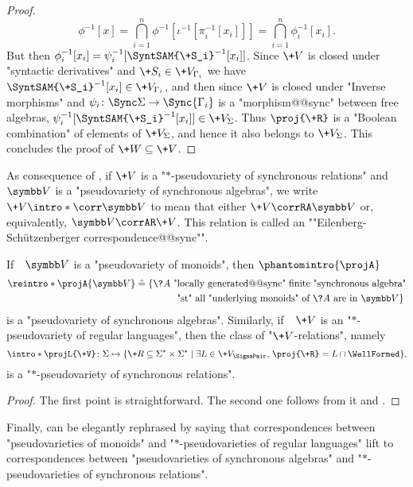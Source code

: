 \begin{proof}
	\[
		\phi^{-1}[x] = \bigcap_{i=1}^n \phi^{-1}[\iota^{-1}[\pi_i^{-1}[x_i]]]
		= \bigcap_{i=1}^n \phi_i^{-1}[x_i].
	\]
	But then $\phi_i^{-1}[x_i] = \psi_i^{-1}[\SyntSAM{\+S_i}^{-1}[x_i]]$.
	Since $\+V$ is closed under "syntactic derivatives" and $\+S_i \in \+V_{\Gamma_i}$
	we have $\SyntSAM{\+S_i}^{-1}[x_i] \in \+V_{\Gamma_i}$, and then since $\+V$ is closed under
	"Inverse morphisms" and $\psi_i\colon \Sync\Sigma \to \Sync{\Gamma_i}$ is a "morphism@@sync" between free algebras,
	$\psi_i^{-1}[\SyntSAM{\+S_i}^{-1}[x_i]] \in \+V_{\Sigma}$.
	Thus $\proj{\+R}$ is a "Boolean combination" of elements of $\+V_{\Sigma}$, and hence
	it also belongs to $\+V_{\Sigma}$. This concludes the proof of $\+W \subseteq \+V$.
\end{proof}

As consequence of , if
$\+V$ is a "$\ast$-pseudovariety of synchronous relations"
and $\B{V}$ is a "pseudovariety of synchronous algebras",
we write \AP$\+V \intro*\corr \B{V}$
to mean that either $\+V \corrRA \B{V}$ or, equivalently, $\B{V} \corrAR \+V$.
This relation is called an \AP""Eilenberg-Schützenberger correspondence@@sync"".

\begin{proposition}
	If~~$\B{V}$ is a "pseudovariety of monoids", then \AP$\phantomintro{\projA}$
	\begin{align*}
		\reintro*\projA{\B{V}} & \defeq
		\{\?A \text{ "locally generated@@sync" finite "synchronous algebra"} \\
		& \qquad\qquad \text{ "st" all "underlying monoids" of $\?A$ are in $\B{V}$}\}
	\end{align*}
	is a "pseudovariety of synchronous algebras". Similarly,
	if~~$\+V$ is an "$\ast$-pseudovariety of regular languages", then
	the class of "$\+V$-relations", namely
	\[
		\intro*\projL{\+V} \colon
		\Sigma \mapsto \{\+R \subseteq \Sigma^* \times \Sigma^* \mid \exists L \in \+V_{\SigmaPair},\, \proj{\+R} = L \cap \WellFormed \},
	\]
	is a "$\ast$-pseudovariety of synchronous relations".
\end{proposition}

\begin{proof}
	The first point is straightforward. The second one follows from it and .
\end{proof}

\AP{}
Finally,  can be elegantly rephrased
by saying that correspondences between "pseudovarieties of monoids"
and "$\ast$-pseudovarieties of regular languages" lift to correspondences
between "pseudovarieties of synchronous algebras" and
"$\ast$-pseudovarieties of synchronous relations".

